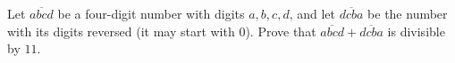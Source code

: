 Let $\overline{abcd}$ be a four-digit number with digits $a,b,c,d$, and let $\overline{dcba}$ be the number with its digits reversed (it may start with $0$). Prove that $\overline{abcd}+\overline{dcba}$ is divisible by $11$.
